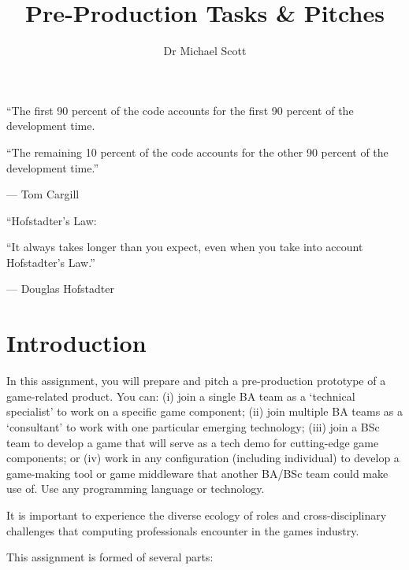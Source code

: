 \documentclass{../fal_assignment}
\title{Pre-Production Tasks \& Pitches}
\author{Dr Michael Scott}
\begin{document}
\maketitle

\begin{marginquote}
    ``The first 90 percent of the code accounts for the first 90 percent of the development time.
    
    ``The remaining 10 percent of the code accounts for the other 90 percent of the development time.''
    
    --- Tom Cargill
    
    \marginquoterule
    
    ``Hofstadter's Law:
    
    ``It always takes longer than you expect, even when you take into account Hofstadter's Law.''
    
    --- Douglas Hofstadter
\end{marginquote}

\section*{Introduction}

In this assignment, you will prepare and pitch a pre-production prototype of a game-related product. You can: (i) join a single BA team as a `technical specialist' to work on a specific game component; (ii) join multiple BA teams as a `consultant' to work with one particular emerging technology; (iii) join a BSc team to develop a game that will serve as a tech demo for cutting-edge game components; or (iv) work in any configuration (including individual) to develop a game-making tool or game middleware that another BA/BSc team could make use of. Use any programming language or technology.

It is important to experience the diverse ecology of roles and cross-disciplinary challenges that computing professionals encounter in the games industry.

This assignment is formed of several parts:
\end{document}
